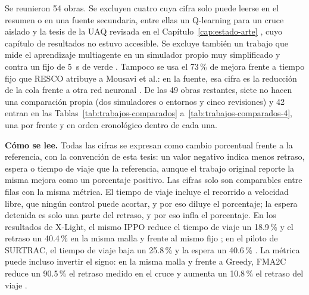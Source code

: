Se reunieron 54 obras. Se excluyen cuatro cuya cifra solo puede leerse
en el resumen o en una fuente secundaria, entre ellas un Q-learning para
un cruce aislado \citep{Abdulhai2003_QLearning} y la tesis de la UAQ
revisada en el Capítulo~\ref{cap:estado-arte} \citep{UAQ2024}, cuyo
capítulo de resultados no estuvo accesible. Se excluye también un
trabajo que mide el aprendizaje multiagente en un simulador propio muy
simplificado y contra un fijo de 5~s de verde
\citep{Mahato2025_MARLvsFijo}. Tampoco se usa el 73\,\% de mejora frente
a tiempo fijo que RESCO \citep{Ault2021_RESCO} atribuye a Mousavi et al.: en la fuente, esa
cifra es la reducción de la cola frente a otra red neuronal
\citep{Mousavi2017_PGDQN}. De las 49 obras restantes, siete no hacen una
comparación propia (dos simuladores o entornos y cinco revisiones) y 42
entran en las Tablas~\ref{tab:trabajos-comparados}
a~\ref{tab:trabajos-comparados-4}, una por frente y en orden
cronológico dentro de cada una.

\textbf{Cómo se lee.} Todas las cifras se expresan como cambio
porcentual frente a la referencia, con la convención de esta tesis: un
valor negativo indica menos retraso, espera o tiempo de viaje que la
referencia, aunque el trabajo original reporte la misma mejora como un
porcentaje positivo. Las cifras solo son comparables entre filas con la
misma métrica. El tiempo de viaje incluye el recorrido a velocidad
libre, que ningún control puede acortar, y por eso diluye el
porcentaje; la espera detenida es solo una parte del retraso, y por eso
infla el porcentaje. En los resultados de
X-Light, el mismo IPPO reduce el tiempo de viaje un 18.9\,\% y el
retraso un 40.4\,\% en la misma malla y frente al mismo fijo
\citep{Jiang2024_XLight}; en el piloto de SURTRAC, el tiempo de viaje
baja un 25.8\,\% y la espera un 40.6\,\% \citep{Smith2013_Surtrac}. La
métrica puede incluso invertir el signo:
en la misma malla y frente a Greedy, FMA2C reduce un 90.5\,\% el retraso
medido en el cruce y aumenta un 10.8\,\% el retraso del viaje
\citep{Ma2020_FMA2C}.

